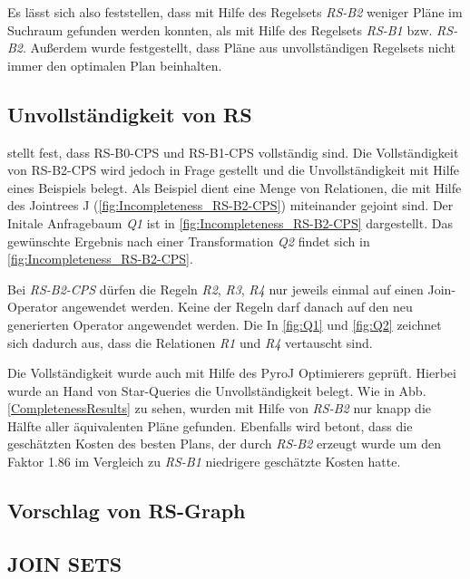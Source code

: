 Es lässt sich also feststellen, dass mit Hilfe des Regelsets \textit{RS-B2} weniger Pläne im Suchraum gefunden werden konnten, als mit Hilfe des Regelsets \textit{RS-B1} bzw. \textit{RS-B2}. Außerdem wurde festgestellt, dass Pläne aus unvollständigen Regelsets nicht immer den optimalen Plan beinhalten.





\subsection{Unvollständigkeit von RS}




\cite{shanbhag2014optimizing} stellt fest, dass RS-B0-CPS und RS-B1-CPS vollständig sind. Die Vollständigkeit von RS-B2-CPS wird jedoch in Frage gestellt und die Unvollständigkeit mit Hilfe eines Beispiels belegt. Als Beispiel dient eine Menge von Relationen, die mit Hilfe des Jointrees J (\ref{fig:Incompleteness_RS-B2-CPS}) miteinander gejoint sind. Der Initale Anfragebaum \textit{Q1} ist in \ref{fig:Incompleteness_RS-B2-CPS} dargestellt. Das gewünschte Ergebnis nach einer Transformation \textit{Q2}  findet sich in \ref{fig:Incompleteness_RS-B2-CPS}. 

Bei \textit{RS-B2-CPS} dürfen die Regeln \textit{R2}, \textit{R3}, \textit{R4} nur jeweils einmal auf einen Join-Operator angewendet werden. Keine der Regeln darf danach auf den neu generierten Operator angewendet werden. Die In \ref{fig:Q1} und \ref{fig:Q2} zeichnet sich dadurch aus, dass die Relationen \textit{R1} und \textit{R4} vertauscht sind.


Die Vollständigkeit wurde auch mit Hilfe des PyroJ Optimierers geprüft. Hierbei wurde an Hand von Star-Queries  die Unvollständigkeit belegt. Wie in Abb. \ref{CompletenessResults} zu sehen, wurden mit Hilfe von \textit{RS-B2} nur knapp die Hälfte aller äquivalenten Pläne gefunden. Ebenfalls wird betont, dass die geschätzten Kosten des besten Plans, der durch \textit{RS-B2} erzeugt wurde um den Faktor 1.86 im Vergleich zu \textit{RS-B1} niedrigere geschätzte Kosten hatte.







\subsection{Vorschlag von RS-Graph}

\subsection{JOIN SETS}

